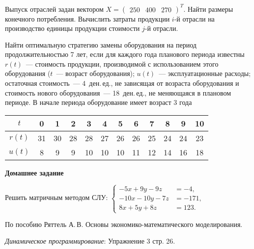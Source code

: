 \documentclass[a5paper,11pt]{extarticle}
\begin{document}
\begin{enumerate}
Выпуск отраслей задан вектором 
$X = \begin{pmatrix} 250 & 400 & 270
\end{pmatrix}^T$. 
Найти размеры конечного потребления. 
Вычислить  затраты продукции $i$-й отрасли на производство единицы продукции стоимости $j$-й отрасли.

 
\item 
	Найти оптимальную стратегию замены оборудования на период продолжительностью 7 лет, если для каждого года планового периода известны
	$r(t)$~--- стоимость продукции, производимой с использованием этого оборудования ($t$~--- возраст оборудования); $u(t)$~--- эксплуатационные расходы; остаточная стоимость~--- 4~ден.\,ед., не зависящая от возраста оборудования и стоимость нового оборудования~--- 18~ден.\,ед., не меняющаяся в плановом периоде.  В начале периода оборудование имеет возраст 3 года
	
	{\centering \begin{tabular}{cccccccccccc}
	\hline 
$t$ &  0 &  1 &  2 &  3 &  4 &  5 &  6 &  7 &  8 &  9 &  10 \\
\hline 
$r(t)$ & 31 & 30 & 28 & 28 & 27 & 26 & 26 & 25 & 24 & 24 &  23 \\
$u(t)$ &  8 &  9 &  9 & 10 & 10 & 10 & 11 & 12 & 14 & 16 &  18 \\
\hline 
\end{tabular}\par}


{\item[] \bfseries Домашнее задание\par}
\item 
	Решить матричным методом СЛУ: 
	$\left\lbrace\begin{aligned} 
    	-5x+ 9y- 9z &= -4,\\
    	-10x- 10y- 7z &= -171,\\
		8x+ 5y+ 8z &= 123.
   \end{aligned}\right.$

По пособию Ряттель А.\,В. Основы экономико-математического моделирования.
\item \textit{Динамическое программирование}: Упражнение 3 стр. 26.







 





 









\end{enumerate}
\end{document}
